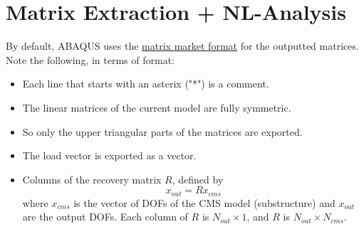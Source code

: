 \documentclass[11pt]{article}
\begin{document}
\section{Matrix Extraction + NL-Analysis}
\label{sec:org2e9d6e5}
By default, ABAQUS uses the \href{https://math.nist.gov/MatrixMarket/}{matrix market format} for the outputted matrices.
Note the following, in terms of format:
\begin{itemize}
\item Each line that starts with an asterix ("*") is a comment.
\item The linear matrices of the current model are fully symmetric.
\item So only the upper triangular parts of the matrices are exported.
\item The load vector is exported as a vector.
\item Columns of the recovery matrix \(R\), defined by
$$ x_{out} = R x_{cms} $$
where \(x_{cms}\) is the vector of DOFs of the CMS model (substructure) and \(x_{out}\) are the output DOFs.
Each column of \(R\) is \(N_{out}\times 1\), and \(R\) is \(N_{out}\times N_{cms}\).
\end{itemize}
\end{document}
